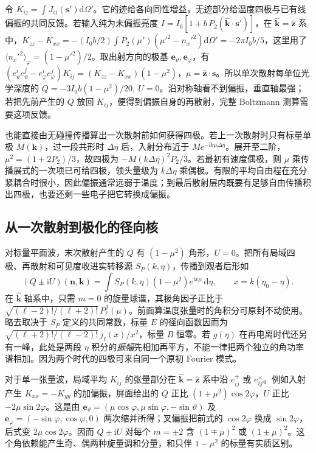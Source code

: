 令 $K_{ij}=\int J_{ij}(\bm s')\mathrm d\Omega'$。它的迹给各向同性增益，无迹部分给温度四极与已有线偏振的共同反馈。若输入纯为未偏振亮度 $I=I_0[1+b\,P_2(\hat{\bm k}\cdot\bm s')]$，在 $\hat{\bm k}=\hat{\bm z}$ 系中，$K_{zz}-K_{xx}=-(I_0 b/2)\int P_2(\mu')(\mu'^2-n_x'^2)\mathrm d\Omega'=-2\pi I_0 b/5$，这里用了 $\langle n_x'^2\rangle_\varphi=(1-\mu'^2)/2$。取出射方向的极基 $\bm e_\vartheta,\bm e_\varphi$，有 $(e_\vartheta^ie_\vartheta^j-e_\varphi^ie_\varphi^j)K_{ij}=(K_{zz}-K_{xx})(1-\mu^2)$，$\mu=\hat{\bm z}\cdot\bm s$。所以单次散射每单位光学深度的 $Q=-3I_0 b(1-\mu^2)/20,\ U=0$。沿对称轴看不到偏振，垂直轴最强；若把先前产生的 $Q$ 放回 $K_{ij}$，便得到偏振自身的再散射，完整 Boltzmann 测算需要这项反馈。

也能直接由无碰撞传播算出一次散射前如何获得四极。若上一次散射时只有标量单极 $M(\bm k)$，过一段共形时 $\Delta\eta$ 后，入射分布近于 $M e^{-\mathrm i k\mu\Delta\eta}$。展开至二阶，$\mu^2=(1+2P_2)/3$，故四极为 $-M(k\Delta\eta)^2 P_2/3$。若最初有速度偶极，则 $\mu$ 乘传播展式的一次项已可给四极，领头量级为 $k\Delta\eta$ 乘偶极。有限的平均自由程在充分紧耦合时很小，因此偏振通常远弱于温度；到最后散射层内既要有足够自由传播积出四极，也要还剩一些电子把它转换成偏振。

\subsection{从一次散射到极化的径向核}

对标量平面波，末次散射产生的 $Q$ 有 $(1-\mu^2)$ 角形，$U=0$。把所有局域四极、再散射和可见度收进实转移源 $S_P(k,\eta)$，传播到观者后形如
\[
 (Q\pm\mathrm i U)(\bm n,\bm k)
 =\int S_P(k,\eta)(1-\mu^2)e^{\mathrm i x\mu}\,\mathrm d\eta,
 \qquad x=k(\eta_0-\eta).
\]
在 $\hat{\bm k}$ 轴系中，只需 $m=0$ 的旋量球谐，其极角因子正比于 $\sqrt{(\ell-2)!/(\ell+2)!}\,P_\ell^2(\mu)$。前面算温度张量时的角积分可原封不动使用。略去取决于 $S_P$ 定义的共同常数，标量 $E$ 的径向函数因而为 $\sqrt{(\ell+2)!/(\ell-2)!}\,j_\ell(x)/x^2$，标量 $B$ 恒零。若 $g(\eta)$ 在再电离时代还另有一峰，此处是两段 $\eta$ 积分的\emph{振幅}先相加再平方，不能一律把两个独立的角功率谱相加。因为两个时代的四极可来自同一个原初 Fourier 模式。

对于单一张量波，局域平均 $K_{ij}$ 的张量部分在 $\hat{\bm k}=\hat{\bm z}$ 系中沿 $e^+_{ij}$ 或 $e^\times_{ij}$。例如入射产生 $K_{xx}=-K_{yy}$ 的加偏振，屏面给出的 $Q$ 正比 $(1+\mu^2)\cos2\varphi$，$U$ 正比 $-2\mu\sin2\varphi$。这是由 $\bm e_\vartheta=(\mu\cos\varphi,\mu\sin\varphi,-\sin\vartheta)$ 及 $\bm e_\varphi=(-\sin\varphi,\cos\varphi,0)$ 两次缩并所得；叉偏振把前式的 $\cos2\varphi$ 换成 $\sin2\varphi$，后式变 $2\mu\cos2\varphi$。因而 $Q\pm\mathrm i U$ 对每个 $m=\pm2$ 含 $(1\mp\mu)^2$ 或 $(1\pm\mu)^2$。这个角依赖能产生奇、偶两种旋量调和分量，和只伴 $1-\mu^2$ 的标量有实质区别。

